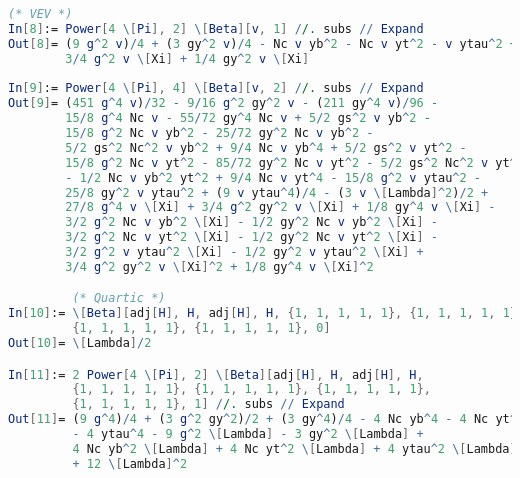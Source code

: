 \documentclass{scrartcl}
\begin{document}
\begin{lstlisting}[language=mathematica,mathescape,columns=flexible,backgroundcolor=\color{light-gray}]
        (* VEV *)
In[8]:= Power[4 \[Pi], 2] \[Beta][v, 1] //. subs // Expand
Out[8]= (9 g^2 v)/4 + (3 gy^2 v)/4 - Nc v yb^2 - Nc v yt^2 - v ytau^2 + 
        3/4 g^2 v \[Xi] + 1/4 gy^2 v \[Xi]
        
In[9]:= Power[4 \[Pi], 4] \[Beta][v, 2] //. subs // Expand
Out[9]= (451 g^4 v)/32 - 9/16 g^2 gy^2 v - (211 gy^4 v)/96 - 
        15/8 g^4 Nc v - 55/72 gy^4 Nc v + 5/2 gs^2 v yb^2 - 
        15/8 g^2 Nc v yb^2 - 25/72 gy^2 Nc v yb^2 - 
        5/2 gs^2 Nc^2 v yb^2 + 9/4 Nc v yb^4 + 5/2 gs^2 v yt^2 - 
        15/8 g^2 Nc v yt^2 - 85/72 gy^2 Nc v yt^2 - 5/2 gs^2 Nc^2 v yt^2 
        - 1/2 Nc v yb^2 yt^2 + 9/4 Nc v yt^4 - 15/8 g^2 v ytau^2 - 
        25/8 gy^2 v ytau^2 + (9 v ytau^4)/4 - (3 v \[Lambda]^2)/2 + 
        27/8 g^4 v \[Xi] + 3/4 g^2 gy^2 v \[Xi] + 1/8 gy^4 v \[Xi] - 
        3/2 g^2 Nc v yb^2 \[Xi] - 1/2 gy^2 Nc v yb^2 \[Xi] - 
        3/2 g^2 Nc v yt^2 \[Xi] - 1/2 gy^2 Nc v yt^2 \[Xi] - 
        3/2 g^2 v ytau^2 \[Xi] - 1/2 gy^2 v ytau^2 \[Xi] + 
        3/4 g^2 gy^2 v \[Xi]^2 + 1/8 gy^4 v \[Xi]^2

         (* Quartic *)
In[10]:= \[Beta][adj[H], H, adj[H], H, {1, 1, 1, 1, 1}, {1, 1, 1, 1, 1}, 
         {1, 1, 1, 1, 1}, {1, 1, 1, 1, 1}, 0]
Out[10]= \[Lambda]/2

In[11]:= 2 Power[4 \[Pi], 2] \[Beta][adj[H], H, adj[H], H, 
         {1, 1, 1, 1, 1}, {1, 1, 1, 1, 1}, {1, 1, 1, 1, 1}, 
         {1, 1, 1, 1, 1}, 1] //. subs // Expand
Out[11]= (9 g^4)/4 + (3 g^2 gy^2)/2 + (3 gy^4)/4 - 4 Nc yb^4 - 4 Nc yt^4 
         - 4 ytau^4 - 9 g^2 \[Lambda] - 3 gy^2 \[Lambda] + 
         4 Nc yb^2 \[Lambda] + 4 Nc yt^2 \[Lambda] + 4 ytau^2 \[Lambda] 
         + 12 \[Lambda]^2


\end{lstlisting}
\end{document}
